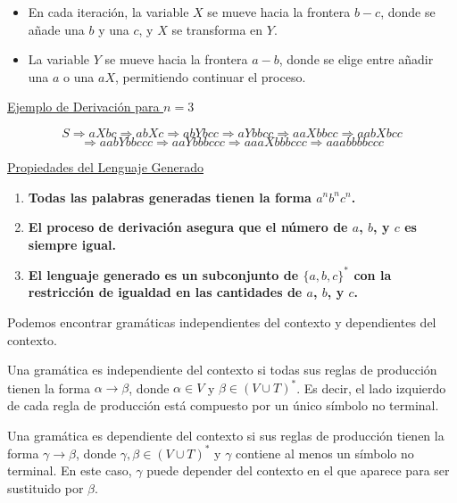 \documentclass[12pt]{report} %
\providecommand{\tightlist}{%
  \setlength{\itemsep}{0pt}\setlength{\parskip}{0pt}}
\begin{document}
\begin{enumerate}
  \begin{itemize}
  \tightlist
  \item
    En cada iteración, la variable \(X\) se mueve hacia la frontera
    \(b-c\), donde se añade una \(b\) y una \(c\), y \(X\) se transforma
    en \(Y\).\\
  \item
    La variable \(Y\) se mueve hacia la frontera \(a-b\), donde se elige
    entre añadir una \(a\) o una \(aX\), permitiendo continuar el
    proceso.
  \end{itemize}
\end{enumerate}

\underline{Ejemplo de Derivación para $n = 3$}

\[
S \Rightarrow aXbc \Rightarrow abXc \Rightarrow abYbcc \Rightarrow aYbbcc \Rightarrow aaXbbcc \Rightarrow aabXbcc 
\] \[
\Rightarrow aabYbbccc \Rightarrow aaYbbbccc \Rightarrow aaaXbbbccc \Rightarrow aaabbbbccc
\]

\underline{Propiedades del Lenguaje Generado}

\begin{enumerate}
\def\labelenumi{\arabic{enumi}.}
\tightlist
\item
  \textbf{Todas las palabras generadas tienen la forma
  \(a^n b^n c^n\).}\\
\item
  \textbf{El proceso de derivación asegura que el número de \(a\),
  \(b\), y \(c\) es siempre igual.}\\
\item
  \textbf{El lenguaje generado es un subconjunto de \(\{a, b, c\}^*\)
  con la restricción de igualdad en las cantidades de \(a\), \(b\), y
  \(c\).}
\end{enumerate}

Podemos encontrar gramáticas independientes del contexto y dependientes
del contexto.

\begin{definicion}
Una gramática es independiente del contexto si todas sus reglas de producción tienen la forma $\alpha \to \beta$, donde $\alpha \in V$ y $\beta \in (V \cup T)^*$. Es decir, el lado izquierdo de cada regla de producción está compuesto por un único símbolo no terminal.
\end{definicion}

\begin{definicion}
Una gramática es dependiente del contexto si sus reglas de producción tienen la forma $\gamma \to \beta$, donde $\gamma, \beta \in (V \cup T)^*$ y $\gamma$ contiene al menos un símbolo no terminal. En este caso, $\gamma$ puede depender del contexto en el que aparece para ser sustituido por $\beta$.
\end{definicion}
\end{document}
